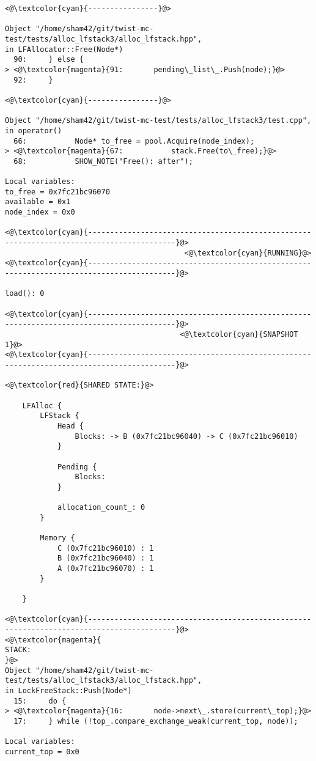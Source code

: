 \begin{adjustwidth}{-3.3cm}{-1cm}
\begin{allintypewriter}
\begin{multicols*}{2}
\begin{lstlisting}[numbers=none]
<@\textcolor{cyan}{----------------}@>

Object "/home/sham42/git/twist-mc-test/tests/alloc_lfstack3/alloc_lfstack.hpp",
in LFAllocator::Free(Node*)
  90:     } else {
> <@\textcolor{magenta}{91:       pending\_list\_.Push(node);}@>
  92:     }

<@\textcolor{cyan}{----------------}@>

Object "/home/sham42/git/twist-mc-test/tests/alloc_lfstack3/test.cpp",
in operator()
  66:           Node* to_free = pool.Acquire(node_index);
> <@\textcolor{magenta}{67:           stack.Free(to\_free);}@>
  68:           SHOW_NOTE("Free(): after");

Local variables: 
to_free = 0x7fc21bc96070
available = 0x1
node_index = 0x0

<@\textcolor{cyan}{------------------------------------------------------------------------------------------}@>
                                         <@\textcolor{cyan}{RUNNING}@>
<@\textcolor{cyan}{------------------------------------------------------------------------------------------}@>

load(): 0

<@\textcolor{cyan}{------------------------------------------------------------------------------------------}@>
                                        <@\textcolor{cyan}{SNAPSHOT 1}@>
<@\textcolor{cyan}{------------------------------------------------------------------------------------------}@>

<@\textcolor{red}{SHARED STATE:}@>

    LFAlloc {
	    LFStack {
		    Head {
			    Blocks: -> B (0x7fc21bc96040) -> C (0x7fc21bc96010) 
		    }

		    Pending {
			    Blocks: 
		    }

		    allocation_count_: 0
	    }

	    Memory {
		    C (0x7fc21bc96010) : 1
		    B (0x7fc21bc96040) : 1
		    A (0x7fc21bc96070) : 1
	    }

    }

<@\textcolor{cyan}{------------------------------------------------------------------------------------------}@>
<@\textcolor{magenta}{
STACK:
}@>
Object "/home/sham42/git/twist-mc-test/tests/alloc_lfstack3/alloc_lfstack.hpp",
in LockFreeStack::Push(Node*)
  15:     do {
> <@\textcolor{magenta}{16:       node->next\_.store(current\_top);}@>
  17:     } while (!top_.compare_exchange_weak(current_top, node));

Local variables: 
current_top = 0x0


\end{lstlisting}
\end{multicols*}
\end{allintypewriter}
\end{adjustwidth}
